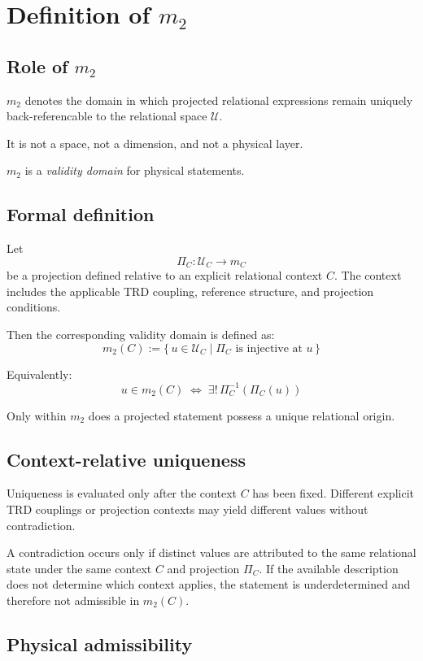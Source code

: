 \section{Definition of $m_2$}

\subsection{Role of $m_2$}

$m_2$ denotes the domain in which
projected relational expressions
remain uniquely back-referencable
to the relational space $\mathcal{U}$.

It is not a space,
not a dimension,
and not a physical layer.

$m_2$ is a \emph{validity domain}
for physical statements.

\subsection{Formal definition}

Let
\[
\Pi_C : \mathcal{U}_C \rightarrow m_C
\]
be a projection defined relative to an explicit relational context $C$.
The context includes the applicable TRD coupling, reference structure,
and projection conditions.

Then the corresponding validity domain is defined as:
\[
m_2(C) := \{\, u \in \mathcal{U}_C \mid \Pi_C \text{ is injective at } u \,\}
\]

Equivalently:
\[
u \in m_2(C)
\;\Longleftrightarrow\;
\exists!\, \Pi_C^{-1}(\Pi_C(u))
\]

Only within $m_2$
does a projected statement
possess a unique relational origin.

\subsection{Context-relative uniqueness}

Uniqueness is evaluated only after the context $C$ has been fixed.
Different explicit TRD couplings or projection contexts may yield
different values without contradiction.

A contradiction occurs only if distinct values are attributed to
the same relational state under the same context $C$ and projection $\Pi_C$.
If the available description does not determine which context applies,
the statement is underdetermined and therefore not admissible in $m_2(C)$.

\subsection{Physical admissibility}

